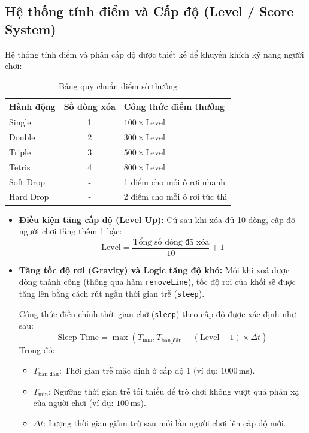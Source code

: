 \subsection{Hệ thống tính điểm và Cấp độ (Level / Score System)}
Hệ thống tính điểm và phân cấp độ được thiết kế để khuyến khích kỹ năng người chơi:

\begin{table}[H]
    \centering
    \begin{tabular}{|l|c|l|}
        \hline
        \textbf{Hành động} & \textbf{Số dòng xóa} & \textbf{Công thức điểm thưởng} \\ \hline
        Single & 1 & $100 \times \mathrm{Level}$ \\ \hline
        Double & 2 & $300 \times \mathrm{Level}$ \\ \hline
        Triple & 3 & $500 \times \mathrm{Level}$ \\ \hline
        Tetris & 4 & $800 \times \mathrm{Level}$ \\ \hline
        Soft Drop & - & 1 điểm cho mỗi ô rơi nhanh \\ \hline
        Hard Drop & - & 2 điểm cho mỗi ô rơi tức thì \\ \hline
    \end{tabular}
    \caption{Bảng quy chuẩn điểm số thưởng}
    \label{tab:scoring}
\end{table}  

\begin{itemize}
    \item \textbf{Điều kiện tăng cấp độ (Level Up):} Cứ sau khi xóa đủ 10 dòng, cấp độ người chơi tăng thêm 1 bậc:
    \[
    \mathrm{Level} = \frac{\mbox{Tổng số dòng đã xóa}}{10} + 1
    \]
    \item \textbf{Tăng tốc độ rơi (Gravity) và Logic tăng độ khó:} 
Mỗi khi xoá được dòng thành công (thông qua hàm \texttt{removeLine}), tốc độ rơi của khối sẽ được tăng lên bằng cách rút ngắn thời gian trễ (\texttt{sleep}). 

Công thức điều chỉnh thời gian chờ (\texttt{sleep}) theo cấp độ được xác định như sau:
\[
\mathrm{Sleep\_Time} = \max \left( T_{\min}, T_{\mathrm{ban\_đầu}} - (\mathrm{Level} - 1) \times \Delta t \right)
\]
Trong đó:
\begin{itemize}
    \item $T_{\mathrm{ban\_đầu}}$: Thời gian trễ mặc định ở cấp độ 1 (ví dụ: $1000\,\mathrm{ms}$).
    \item $T_{\min}$: Ngưỡng thời gian trễ tối thiểu để trò chơi không vượt quá phản xạ của người chơi (ví dụ: $100\,\mathrm{ms}$).
    \item $\Delta t$: Lượng thời gian giảm trừ sau mỗi lần người chơi lên cấp độ mới.
\end{itemize}
\end{itemize}

